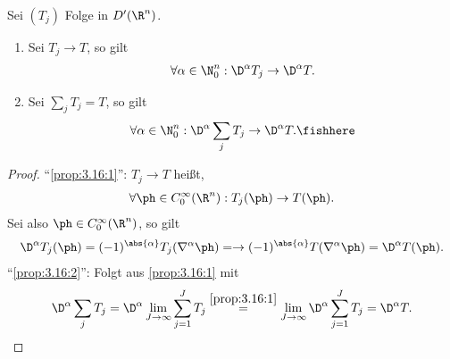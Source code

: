 \begin{prop}
\label{prop:3.16}
Sei $(T_j)$ Folge in $D'(\R^n)$.
\begin{enumerate}[label=(\roman{*})]
  \item\label{prop:3.16:1} Sei $T_j\to T$, so gilt
\begin{align*}
\forall \alpha\in\N_0^n : \D^\alpha T_j \to \D^\alpha T.
\end{align*}
\item\label{prop:3.16:2} Sei $\sum_j T_j = T$, so gilt
\begin{align*}
\forall \alpha\in\N_0^n : \D^\alpha \sum_j T_j \to \D^\alpha T.\fishhere
\end{align*}
\end{enumerate}
\end{prop}
\begin{proof}
``\ref{prop:3.16:1}'': $T_j\to T$ heißt,
\begin{align*}
\forall \ph\in C_0^\infty(\R^n) : T_j(\ph)\to T(\ph).
\end{align*}
Sei also $\ph\in C_0^\infty(\R^n)$, so gilt
\begin{align*}
\D^\alpha T_j(\ph) = (-1)^{\abs{\alpha}}T_j(\nabla^\alpha \ph) =
\to  (-1)^{\abs{\alpha}}T(\nabla^\alpha \ph) = \D^\alpha T(\ph).
\end{align*}
``\ref{prop:3.16:2}'': Folgt aus \ref{prop:3.16:1} mit
\begin{align*}
\D^\alpha \sum_j T_j = \D^\alpha \lim\limits_{J\to\infty} \sum\limits_{j=1}^J
T_j
\overset{\ref{prop:3.16:1}}{=}
 \lim\limits_{J\to\infty} \D^\alpha  \sum\limits_{j=1}^J T_j = \D^\alpha
 T.\qedhere
\end{align*}
\end{proof}

